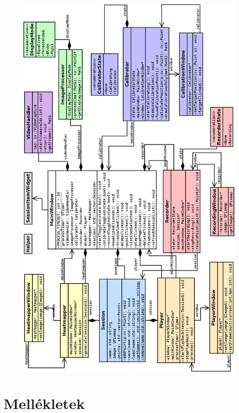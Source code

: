\begin{figure}[!ht]
\centering
\includegraphics[width=130mm, keepaspectratio]{figures/class_diagram_aa.png}
\end{figure}


\newpage
\section{Mellékletek}\label{sect:mellekletek}

